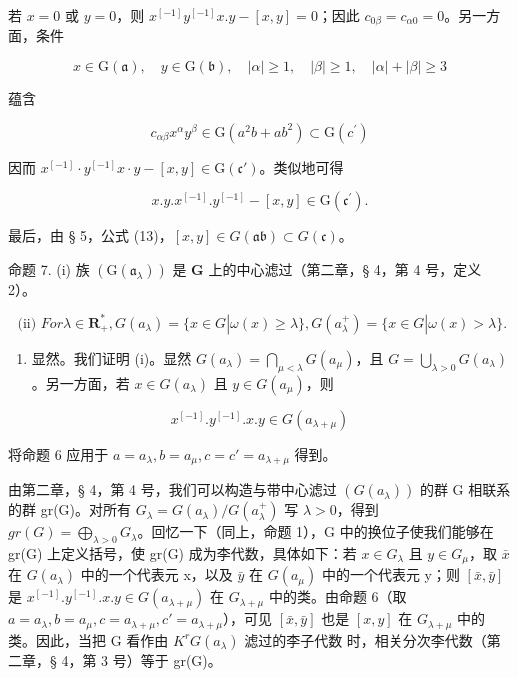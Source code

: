 若 \(x = 0\) 或 \(y = 0\)，则 \(x^{[-1]}y^{[-1]}x.y - [x,y] = 0\)；因此 \(c_{0\beta} = c_{\alpha 0} = 0\)。另一方面，条件

\[
x \in \mathrm{G} (\mathfrak {a}), \quad y \in \mathrm{G} (\mathfrak {b}), \quad | \alpha | \geqslant 1, \quad | \beta | \geqslant 1, \quad | \alpha | + | \beta | \geqslant 3
\]

蕴含

\[
c _ {\alpha \beta} x ^ {\alpha} y ^ {\beta} \in \mathrm{G} (a ^ {2} b + a b ^ {2}) \subset \mathrm{G} (c ^ {\prime})
\]

因而 \(x^{[-1]} \cdot y^{[-1]}x \cdot y - [x, y] \in \mathrm{G}(\mathfrak{c}')\)。类似地可得

\[
x. y. x ^ {[ - 1 ]}. y ^ {[ - 1 ]} - [ x, y ] \in \mathrm{G} (\mathfrak {c} ^ {\prime}).
\]

最后，由 § 5，公式 (13)，\([x,y] \in G(\mathfrak{ab}) \subset G(\mathfrak{c})\)。

命题 7. (i) 族 \((\mathrm{G}(\mathfrak{a}_{\lambda}))\) 是 \(\mathbf{G}\) 上的中心滤过（第二章，§ 4，第 4 号，定义 2）。

\[
\text { (ii) } For \lambda \in \mathbf {R} _ {+} ^ {*}, G (a _ {\lambda}) = \{x \in G | \omega (x) \geqslant \lambda \}, G (a _ {\lambda} ^ {+}) = \{x \in G | \omega (x) > \lambda \}.
\]

\begin{enumerate}
\def\labelenumi{(\roman{enumi})}
\setcounter{enumi}{1}
\tightlist
\item
  显然。我们证明 (i)。显然 \(G(a_{\lambda}) = \bigcap_{\mu < \lambda} G(a_{\mu})\)，且 \(G = \bigcup_{\lambda > 0} G(a_{\lambda})\)。另一方面，若 \(x \in G(a_{\lambda})\) 且 \(y \in G(a_{\mu})\)，则
\end{enumerate}

\[
x ^ {[ - 1 ]}. y ^ {[ - 1 ]}. x. y \in G (a _ {\lambda + \mu})
\]

将命题 6 应用于 \(a = a_{\lambda}, b = a_{\mu}, c = c' = a_{\lambda + \mu}\) 得到。

由第二章，§ 4，第 4 号，我们可以构造与带中心滤过 \((G(a_\lambda))\) 的群 G 相联系的群 gr(G)。对所有 \(G_\lambda = G(a_\lambda)/G(a_\lambda^+)\) 写 \(\lambda > 0\)，得到 \(gr(G) = \bigoplus_{\lambda>0} G_\lambda\)。回忆一下（同上，命题 1），G 中的换位子使我们能够在 gr(G) 上定义括号，使 gr(G) 成为李代数，具体如下：若 \(x \in G_\lambda\) 且 \(y \in G_\mu\)，取 \(\bar{x}\) 在 \(G(a_\lambda)\) 中的一个代表元 x，以及 \(\bar{y}\) 在 \(G(a_\mu)\) 中的一个代表元 y；则 \([\bar{x},\bar{y}]\) 是 \(x^{[-1]}.y^{[-1]}.x.y \in G(a_{\lambda+\mu})\) 在 \(G_{\lambda+\mu}\) 中的类。由命题 6（取 \(a = a_\lambda, b = a_\mu, c = a_{\lambda+\mu}, c' = a_{\lambda+\mu}\)），可见 \([\bar{x},\bar{y}]\) 也是 \([x,y]\) 在 \(G_{\lambda+\mu}\) 中的类。因此，当把 G 看作由 \(K^r\)\(G(a_\lambda)\) 滤过的李子代数  时，相关分次李代数（第二章，§ 4，第 3 号）等于 gr(G)。

